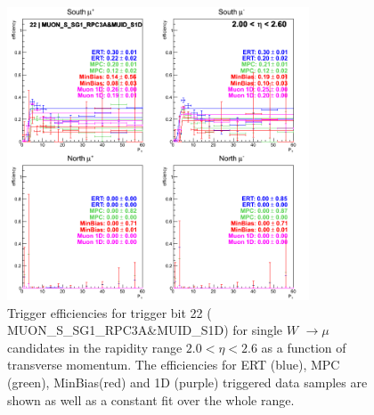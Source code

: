 \begin{figure}[ht]
\begin{center}
\includegraphics[width=0.8\textwidth]{./figures/run13_trigeffipt_eta2_trig22_lin.png}
\caption{\label{fig:run13_trigeffipt_eta2_nper0_trig22_lin} Trigger efficiencies for trigger bit 22 ( MUON\_S\_SG1\_RPC3A\&MUID\_S1D) for single $W$ $\rightarrow \mu$ candidates in the rapidity range $ 2.0 < \eta < 2.6$ as a function of transverse momentum. The efficiencies for ERT (blue), MPC (green), MinBias(red) and 1D (purple) triggered data samples are shown as well as a constant fit over the whole range.}
\end{center}
\end{figure}

\clearpage

